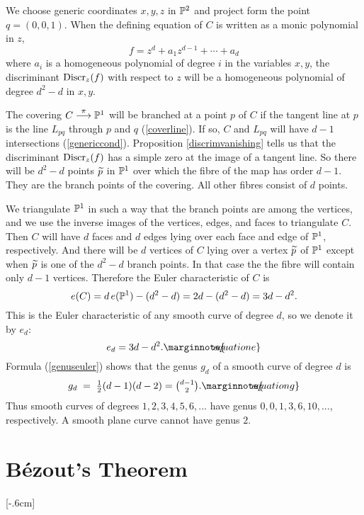 \documentclass[leqno]{book}
\newcommand\Marginnote[1]{\marginnote{\hspace{-12pt}\normalfont{#1}}}
\theoremstyle{definition}%
\numberwithin{equation}{section}
\theoremstyle{theorem} %
\begin{document}
\ms We choose generic coordinates $x,y,z$ in  $\mathbb{P}^2$ and
project form the point $q = (0,0,1)$.  When the defining
equation of $C$ is written as a monic polynomial in $z$, 
$$f = z^{d}+a_1z^{d-1} + \cdots + a_d$$ where $a_i$ is a
homogeneous polynomial of degree $i$ in the variables $x,y$, the
discriminant $\operatorname{Discr}_z(f)$ with respect to $z$ will be a homogeneous
polynomial of degree $d^2-d$ in $x,y$.


The covering $C \stackrel\pi\longrightarrow \mathbb{P}^1$ will be branched
at a point $p$ of $C$ if the tangent line at $p$ is the line $L_{pq}$
through $p$ and $q$ (\ref{coverline}).  If so, $C$ and $L_{pq}$
will have $d-1$ intersections (\ref{genericcond}).  Proposition
\ref{discrimvanishing} tells us that the discriminant $\operatorname{Discr}_z(f)$
has a simple zero at the image of a tangent line.  So there will be
$d^2-d$ points $\widetilde p$ in $\mathbb{P}^1$ over which the fibre of the map has
order $d-1$.  They are the branch points of the covering.  All other
fibres consist of $d$ points.



We triangulate $\mathbb{P}^1$ in such a way that the branch points are among
the vertices, and we use the inverse images of the vertices, edges,
and faces to triangulate $C$.  Then $C$ will have $d$ faces and $d$
edges lying over each face and edge of $\mathbb{P}^1$, respectively.  And
there will be $d$ vertices of $C$ lying over a vertex $\widetilde p$ of
$\mathbb{P}^1$ except when $\widetilde p$ is one of the $d^2-d$ branch points. In
that case the the fibre will contain only $d-1$ vertices.  Therefore
the Euler characteristic of $C$ is
$$e(C) = d\,e(\mathbb{P}^1) - (d^2-d) = 2d - (d^2-d)= 3d-d^2.$$ 
This is the Euler
characteristic of any smooth curve of degree $d$, so we denote
it by $e_d$:
\begin{equation}
 e_d = 3d-d^2.  \Marginnote{equatione}	
 \label{equatione}\end{equation}
Formula (\ref{genuseuler}) shows that the genus $g_d$ of a smooth curve of degree $d$ is
\begin{equation}
g_d \;=\; \textstyle{\frac 1 2}(d-1)(d-2) =
\textstyle\binom{d-1}2.\Marginnote{equationg}
	\label{equationg}
\end{equation}
Thus smooth curves of degrees $1,2,3,4,5,6,...$ have genus
$0,0,1,3,6,10,...$, respectively.  A smooth plane curve cannot have
genus $2$.


 \section{B\'ezout's Theorem} \label{bezoutthm} 
\Marginnote{bezoutthm}[-.6cm]
\end{document}
